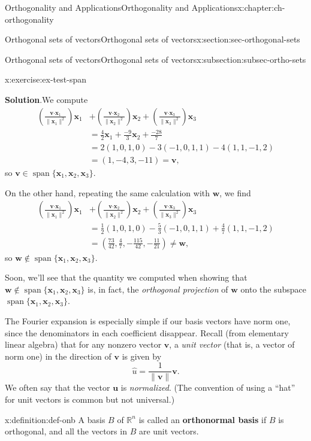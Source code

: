 \documentclass[oneside,10pt,]{book}
\newcommand{\blocktitlefont}{\relax}
\newcommand{\terminology}[1]{\textbf{#1}}
\numberwithin{equation}{section}
\newcommand{\spn}{\operatorname{span}}
\newcommand{\R}{\mathbb{R}}
\newcommand{\dotp}{\!\boldsymbol{\cdot}\!}
\newcommand{\len}[1]{\lVert #1\rVert}
\newcommand{\uu}{\mathbf{u}}
\newcommand{\vv}{\mathbf{v}}
\newcommand{\ww}{\mathbf{w}}
\newcommand{\xx}{\mathbf{x}}
\newcommand{\amp}{&}
\begin{document}
\begin{chapterptx}{Orthogonality and Applications}{}{Orthogonality and Applications}{}{}{x:chapter:ch-orthogonality}
\begin{sectionptx}{Orthogonal sets of vectors}{}{Orthogonal sets of vectors}{}{}{x:section:sec-orthogonal-sets}
\begin{subsectionptx}{Orthogonal sets of vectors}{}{Orthogonal sets of vectors}{}{}{x:subsection:subsec-ortho-sets}
\begin{inlineexercise}{}{x:exercise:ex-test-span}
\par\smallskip%
\noindent\textbf{\blocktitlefont Solution}.\label{g:solution:idm45936166043408}{}\hypertarget{g:solution:idm45936166043408}{}\quad{}We compute%
\begin{align*}
\left(\frac{\vv\dotp\xx_1}{\len{\xx_1}^2}\right)\mathbf{x}_1
\amp +\left(\frac{\vv\dotp\xx_2}{\len{\xx_2}^2}\right)\mathbf{x}_2
+\left(\frac{\vv\dotp\xx_3}{\len{\xx_3}^2}\right)\mathbf{x}_3\\
\amp = \frac{4}{2}\xx_1+\frac{-9}{3}\xx_2+\frac{-28}{7}\\
\amp = 2(1,0,1,0)-3(-1,0,1,1)-4(1,1,-1,2)\\
\amp = (1,-4,3,-11) = \vv\text{,}
\end{align*}
so \(\vv\in\spn\{\xx_1,\xx_2,\xx_3\}\).%
\par
On the other hand, repeating the same calculation with \(\ww\), we find%
\begin{align*}
\left(\frac{\vv\dotp\xx_1}{\len{\xx_1}^2}\right)\xx_1
\amp +\left(\frac{\vv\dotp\xx_2}{\len{\xx_2}^2}\right)\xx_2
+\left(\frac{\vv\dotp\xx_3}{\len{\xx_3}^2}\right)\xx_3\\
\amp =\frac12 (1,0,1,0)-\frac53 (-1,0,1,1) +\frac47 (1,1,-1,2)\\
\amp = \left(\frac{73}{42},\frac47,-\frac{115}{42},-\frac{11}{21}\right)\neq \ww\text{,}
\end{align*}
so \(\ww\notin\spn\{\xx_1,\xx_2,\xx_3\}\).%
\par
Soon, we'll see that the quantity we computed when showing that \(\ww\notin\spn\{\xx_1,\xx_2,\xx_3\}\) is, in fact, the \emph{orthogonal projection} of \(\ww\) onto the subspace \(\spn\{\xx_1,\xx_2,\xx_3\}\).%
\end{inlineexercise}%
The Fourier expansion is especially simple if our basis vectors have norm one, since the denominators in each coefficient disappear. Recall (from elementary linear algebra) that for any nonzero vector \(\vv\), a \emph{unit vector} (that is, a vector of norm one) in the direction of \(\vv\) is given by%
\begin{equation*}
\hat{u} = \frac{1}{\len{\vv}}\vv\text{.}
\end{equation*}
We often say that the vector \(\uu\) is \emph{normalized}. (The convention of using a ``hat'' for unit vectors is common but not universal.)%
\begin{definition}{}{x:definition:def-onb}%
A basis \(B\) of \(\R^n\) is called an \terminology{orthonormal basis} if \(B\) is orthogonal, and all the vectors in \(B\) are unit vectors.%

\end{definition}
\end{subsectionptx}
\end{sectionptx}
\end{chapterptx}
\end{document}

